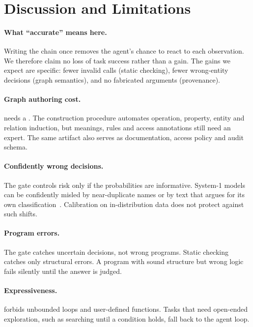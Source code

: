 \section{Discussion and Limitations}
\label{sec:discussion}

\paragraph{What ``accurate'' means here.} Writing the chain once removes the agent's chance to react to each observation. We therefore claim no loss of task success rather than a gain. The gains we expect are specific: fewer invalid calls (static checking), fewer wrong-entity decisions (graph semantics), and no fabricated arguments (provenance). 

\paragraph{Graph authoring cost.} \jif needs a \sog. The construction procedure automates operation, property, entity and relation induction, but meanings, rules and access annotations still need an expert. The same artifact also serves as documentation, access policy and audit schema. 

\paragraph{Confidently wrong decisions.} The gate controls risk only if the probabilities are informative. System-1 models can be confidently misled by near-duplicate names or by text that argues for its own classification~\cite{li2026jevjudge}. Calibration on in-distribution data does not protect against such shifts. 

\paragraph{Program errors.} The gate catches uncertain decisions, not wrong programs. Static checking catches only structural errors. A program with sound structure but wrong logic fails silently until the answer is judged. 

\paragraph{Expressiveness.} \pyif forbids unbounded loops and user-defined functions. Tasks that need open-ended exploration, such as searching until a condition holds, fall back to the agent loop. 

